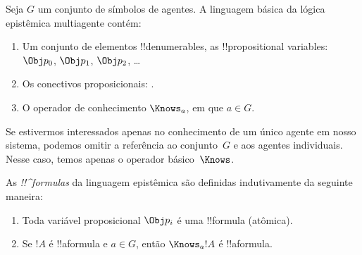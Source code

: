 \documentclass[../../../include/open-logic-section]{subfiles}
\begin{document}


\begin{defn}
Seja $G$ um conjunto de símbolos de agentes. A linguagem básica da
lógica epistêmica multiagente contém:
\begin{enumerate}
  \item Um conjunto de elementos !!{denumerable}s, as !!{propositional variable}s: $\Obj
    p_0$, $\Obj p_1$, $\Obj p_2$, \dots
  \item Os conectivos proposicionais: \startycommalist
  .
  \item O operador de conhecimento $\Knows_a$, em que $a \in G$.
\end{enumerate}
\end{defn}

Se estivermos interessados apenas no conhecimento de um único agente
em nosso sistema, podemos omitir a referência ao conjunto~$G$ e aos
agentes individuais. Nesse caso, temos apenas o operador
básico~$\Knows$.

\begin{defn}
As \emph{!!^{formula}s} da linguagem epistêmica são definidas
  indutivamente da seguinte maneira:
\begin{enumerate}


\item Toda variável proposicional $\Obj p_i$ é uma !!{formula} (atômica).






\item Se $!A$ é !!a{formula} e $a \in G$, então $\Knows_a !A$ é
  !!a{formula}.

\end{enumerate}
\end{defn}
\end{document}
